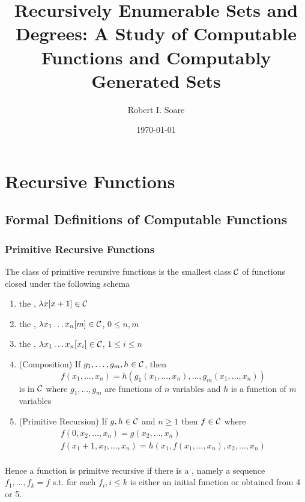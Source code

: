 \documentclass[11pt]{article}
\author{Robert I. Soare}
\date{\today}
\title{Recursively Enumerable Sets and Degrees: A Study of Computable Functions and Computably Generated Sets}
\begin{document}
\maketitle
\tableofcontents \clearpage
\section{Recursive Functions}
\label{sec:org0ffea22}
\subsection{Formal Definitions of Computable Functions}
\label{sec:orgc1a3b08}
\subsubsection{Primitive Recursive Functions}
\label{sec:org5192850}
\begin{definition}[]
The class of primitive recursive functions is the smallest class \(\mathcal{C}\) of
functions closed under the following schema
\begin{enumerate}
\item the , \(\lambda x[x+1]\in\mathcal{C}\)
\item the , \(\lambda x_1\dots x_n[m]\in\mathcal{C}\), \(0\le n,m\)
\item the , \(\lambda x_1\dots x_n[x_i]\in\mathcal{C}\), \(1\le
      i\le n\)
\item (Composition) If \(g_1,\dots,g_m,h\in\mathcal{C}\), then
\begin{equation*}
f(x_1,\dots,x_n)=h(g_1(x_1,\dots,x_n),\dots,g_m(x_1,\dots,x_n))
\end{equation*}
is in \(\mathcal{C}\) where \(g_1,\dots,g_m\) are functions of \(n\) variables and \(h\)
is a function of \(m\) variables
\item (Primitive Recursion) If \(g,h\in\mathcal{C}\) and \(n\ge 1\) then \(f\in\mathcal{C}\) where
\begin{gather*}
f(0,x_2,\dots,x_n)=g(x_2,\dots,x_n)\\
f(x_1+1,x_2,\dots,x_n)=h(x_1,f(x_1,\dots,x_n),x_2,\dots,x_n)\\
\end{gather*}
\end{enumerate}
\end{definition}


Hence a function is primitve recursive if there is a , namely
a sequence \(f_1,\dots,f_k=f\) s.t. for each \(f_i,i\le k\) is either an initial
function or obtained from 4 or 5.
\end{document}
